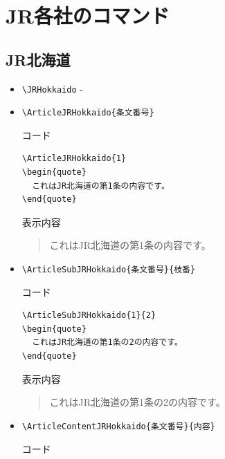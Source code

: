 \documentclass[oneside,10pt,a4paper]{jsarticle}
\begin{document}

  \section{JR各社のコマンド}

  \subsection{JR北海道}

  \begin{itemize}
    \item \verb|\JRHokkaido| - \JRHokkaido
    \item \verb|\ArticleJRHokkaido{条文番号}|
      \begin{itembox}[l]{コード}
        \begin{verbatim}
\ArticleJRHokkaido{1}
\begin{quote}
  これはJR北海道の第1条の内容です。
\end{quote}\end{verbatim}
      \end{itembox}
      \begin{itembox}[l]{表示内容}
        \begin{quote}
          これはJR北海道の第1条の内容です。
        \end{quote}
      \end{itembox}
    \item \verb|\ArticleSubJRHokkaido{条文番号}{枝番}|
      \begin{itembox}[l]{コード}
        \begin{verbatim}
\ArticleSubJRHokkaido{1}{2}
\begin{quote}
  これはJR北海道の第1条の2の内容です。
\end{quote}\end{verbatim}
      \end{itembox}
      \begin{itembox}[l]{表示内容}
        \begin{quote}
          これはJR北海道の第1条の2の内容です。
        \end{quote}
      \end{itembox}
    \newpage
    \item \verb|\ArticleContentJRHokkaido{条文番号}{内容}|
      \begin{itembox}[l]{コード}
        \begin{verbatim}

\end{verbatim}
\end{itembox}
\end{itemize}
\end{document}
